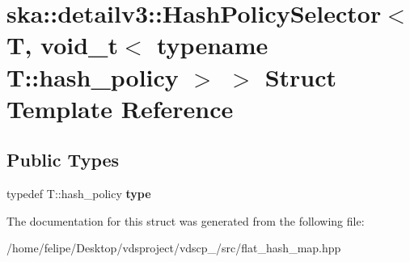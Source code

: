 \section{ska\+:\+:detailv3\+:\+:Hash\+Policy\+Selector$<$ T, void\+\_\+t$<$ typename T\+:\+:hash\+\_\+policy $>$ $>$ Struct Template Reference}
\label{structska_1_1detailv3_1_1HashPolicySelector_3_01T_00_01void__t_3_01typename_01T_1_1hash__policy_01_4_01_4}
\subsection*{Public Types}
\begin{DoxyCompactItemize}
\item 
typedef T\+::hash\+\_\+policy {\bfseries type}\label{structska_1_1detailv3_1_1HashPolicySelector_3_01T_00_01void__t_3_01typename_01T_1_1hash__policy_01_4_01_4_a7d2e238bd61f99a9749a749fe06b795c}

\end{DoxyCompactItemize}


The documentation for this struct was generated from the following file\+:\begin{DoxyCompactItemize}
\item 
/home/felipe/\+Desktop/vdsproject/vdscp\+\_/src/flat\+\_\+hash\+\_\+map.\+hpp\end{DoxyCompactItemize}

